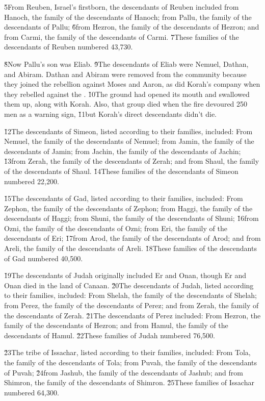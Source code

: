 \v{5}From Reuben, Israel's firstborn, the descendants of Reuben included from Hanoch, the family of the descendants of Hanoch; from Pallu, the family of the descendants of Pallu; \v{6}from Hezron, the family of the descendants of Hezron; and from Carmi, the family of the descendants of Carmi. \v{7}These families of the descendants of Reuben numbered 43,730.

\v{8}Now Pallu's son was Eliab. \v{9}The descendants of Eliab were Nemuel, Dathan, and Abiram. Dathan and Abiram were removed from the community because they joined the rebellion against Moses and Aaron, as did Korah's company when they rebelled against the . \v{10}The ground had opened its mouth and swallowed them up, along with Korah. Also, that group died when the fire devoured 250 men as a warning sign, \v{11}but Korah's direct descendants didn't die.

\v{12}The descendants of Simeon, listed according to their families, included: From Nemuel, the family of the descendants of Nemuel; from Jamin, the family of the descendants of Jamin; from Jachin, the family of the descendants of Jachin; \v{13}from Zerah, the family of the descendants of Zerah; and from Shaul, the family of the descendants of Shaul. \v{14}These families of the descendants of Simeon numbered 22,200.

\v{15}The descendants of Gad, listed according to their families, included: From Zephon, the family of the descendants of Zephon; from Haggi, the family of the descendants of Haggi; from Shuni, the family of the descendants of Shuni; \v{16}from Ozni, the family of the descendants of Ozni; from Eri, the family of the descendants of Eri; \v{17}from Arod, the family of the descendants of Arod; and from Areli, the family of the descendants of Areli. \v{18}These families of the descendants of Gad numbered 40,500.

\v{19}The descendants of Judah originally included Er and Onan, though Er and Onan died in the land of Canaan. \v{20}The descendants of Judah, listed according to their families, included: From Shelah, the family of the descendants of Shelah; from Perez, the family of the descendants of Perez; and from Zerah, the family of the descendants of Zerah. \v{21}The descendants of Perez included: From Hezron, the family of the descendants of Hezron; and from Hamul, the family of the descendants of Hamul. \v{22}These families of Judah numbered 76,500.

\v{23}The tribe of Issachar, listed according to their families, included: From Tola, the family of the descendants of Tola; from Puvah, the family of the descendants of Puvah; \v{24}from Jashub, the family of the descendants of Jashub; and from Shimron, the family of the descendants of Shimron. \v{25}These families of Issachar numbered 64,300.

